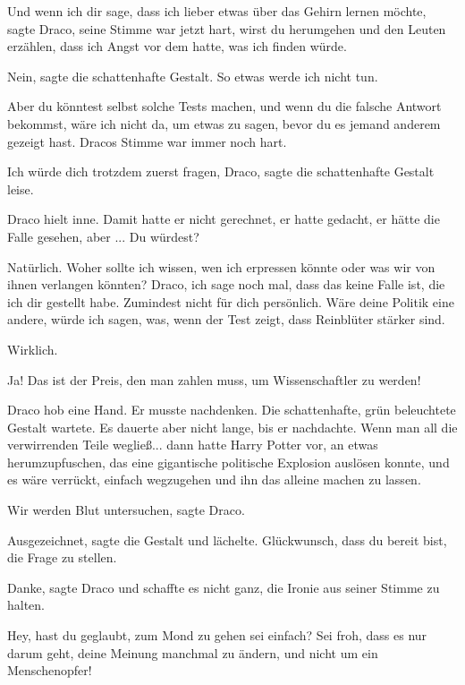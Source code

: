 \glqq{}Und wenn ich dir sage, dass ich lieber etwas über das Gehirn lernen
möchte\grqq{}, sagte Draco, seine Stimme war jetzt hart, \glqq{}wirst du
herumgehen und den Leuten erzählen, dass ich Angst vor dem hatte, was ich finden
würde.\grqq{}

\glqq{}Nein\grqq{}, sagte die schattenhafte Gestalt. \glqq{}So etwas werde ich
nicht tun.\grqq{}

\glqq{}Aber du könntest selbst solche Tests machen, und wenn du die falsche
Antwort bekommst, wäre ich nicht da, um etwas zu sagen, bevor du es jemand
anderem gezeigt hast.\grqq{} Dracos Stimme war immer noch hart.

\glqq{}Ich würde dich trotzdem zuerst fragen, Draco\grqq{}, sagte die
schattenhafte Gestalt leise.

Draco hielt inne. Damit hatte er nicht gerechnet, er hatte gedacht, er hätte die
Falle gesehen, aber ... \glqq{}Du würdest?\grqq{}

\glqq{}Natürlich. Woher sollte ich wissen, wen ich erpressen könnte oder was wir
von ihnen verlangen könnten? Draco, ich sage noch mal, dass das keine Falle ist,
die ich dir gestellt habe. Zumindest nicht für dich persönlich. Wäre deine
Politik eine andere, würde ich sagen, was, wenn der Test zeigt, dass Reinblüter
stärker sind.\grqq{}

\glqq{}Wirklich.\grqq{}

\glqq{}Ja! Das ist der Preis, den man zahlen muss, um Wissenschaftler zu
werden!\grqq{}

Draco hob eine Hand. Er musste nachdenken. Die schattenhafte, grün beleuchtete
Gestalt wartete. Es dauerte aber nicht lange, bis er nachdachte. Wenn man all
die verwirrenden Teile wegließ... dann hatte Harry Potter vor, an etwas
herumzupfuschen, das eine gigantische politische Explosion auslösen konnte, und
es wäre verrückt, einfach wegzugehen und ihn das alleine machen zu lassen.

\glqq{}Wir werden Blut untersuchen\grqq{}, sagte Draco.

\glqq{}Ausgezeichnet\grqq{}, sagte die Gestalt und lächelte. \glqq{}Glückwunsch,
dass du bereit bist, die Frage zu stellen.\grqq{}

\glqq{}Danke\grqq{}, sagte Draco und schaffte es nicht ganz, die Ironie aus
seiner Stimme zu halten.

\glqq{}Hey, hast du geglaubt, zum Mond zu gehen sei einfach? Sei froh, dass es
nur darum geht, deine Meinung manchmal zu ändern, und nicht um ein
Menschenopfer!\grqq{}


